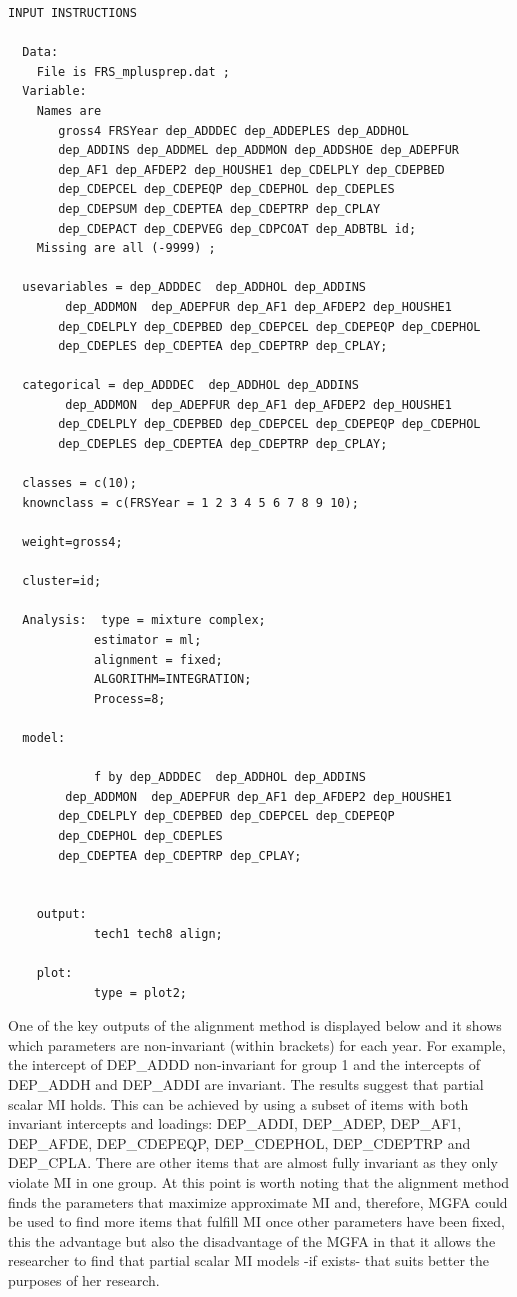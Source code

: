 \documentclass[]{book}
\begin{document}
\begin{verbatim}
INPUT INSTRUCTIONS

  Data:
    File is FRS_mplusprep.dat ;
  Variable:
    Names are
       gross4 FRSYear dep_ADDDEC dep_ADDEPLES dep_ADDHOL 
       dep_ADDINS dep_ADDMEL dep_ADDMON dep_ADDSHOE dep_ADEPFUR 
       dep_AF1 dep_AFDEP2 dep_HOUSHE1 dep_CDELPLY dep_CDEPBED 
       dep_CDEPCEL dep_CDEPEQP dep_CDEPHOL dep_CDEPLES
       dep_CDEPSUM dep_CDEPTEA dep_CDEPTRP dep_CPLAY 
       dep_CDEPACT dep_CDEPVEG dep_CDPCOAT dep_ADBTBL id;
    Missing are all (-9999) ;

  usevariables = dep_ADDDEC  dep_ADDHOL dep_ADDINS
        dep_ADDMON  dep_ADEPFUR dep_AF1 dep_AFDEP2 dep_HOUSHE1
       dep_CDELPLY dep_CDEPBED dep_CDEPCEL dep_CDEPEQP dep_CDEPHOL 
       dep_CDEPLES dep_CDEPTEA dep_CDEPTRP dep_CPLAY;

  categorical = dep_ADDDEC  dep_ADDHOL dep_ADDINS
        dep_ADDMON  dep_ADEPFUR dep_AF1 dep_AFDEP2 dep_HOUSHE1
       dep_CDELPLY dep_CDEPBED dep_CDEPCEL dep_CDEPEQP dep_CDEPHOL 
       dep_CDEPLES dep_CDEPTEA dep_CDEPTRP dep_CPLAY;

  classes = c(10);
  knownclass = c(FRSYear = 1 2 3 4 5 6 7 8 9 10);

  weight=gross4;

  cluster=id;

  Analysis:  type = mixture complex;
            estimator = ml;
            alignment = fixed;
            ALGORITHM=INTEGRATION;
            Process=8;

  model:
            
            f by dep_ADDDEC  dep_ADDHOL dep_ADDINS
        dep_ADDMON  dep_ADEPFUR dep_AF1 dep_AFDEP2 dep_HOUSHE1
       dep_CDELPLY dep_CDEPBED dep_CDEPCEL dep_CDEPEQP 
       dep_CDEPHOL dep_CDEPLES
       dep_CDEPTEA dep_CDEPTRP dep_CPLAY;


    output:
            tech1 tech8 align;

    plot:
            type = plot2;
\end{verbatim}

One of the key outputs of the alignment method is displayed below and it shows which parameters are non-invariant (within brackets) for each year. For example, the intercept of DEP\_ADDD non-invariant for group 1 and the intercepts of DEP\_ADDH and DEP\_ADDI are invariant. The results suggest that partial scalar MI holds. This can be achieved by using a subset of items with both invariant intercepts and loadings: DEP\_ADDI, DEP\_ADEP, DEP\_AF1, DEP\_AFDE, DEP\_CDEPEQP, DEP\_CDEPHOL, DEP\_CDEPTRP and DEP\_CPLA. There are other items that are almost fully invariant as they only violate MI in one group. At this point is worth noting that the alignment method finds the parameters that maximize approximate MI and, therefore, MGFA could be used to find more items that fulfill MI once other parameters have been fixed, this the advantage but also the disadvantage of the MGFA in that it allows the researcher to find that partial scalar MI models -if exists- that suits better the purposes of her research.
\end{document}
